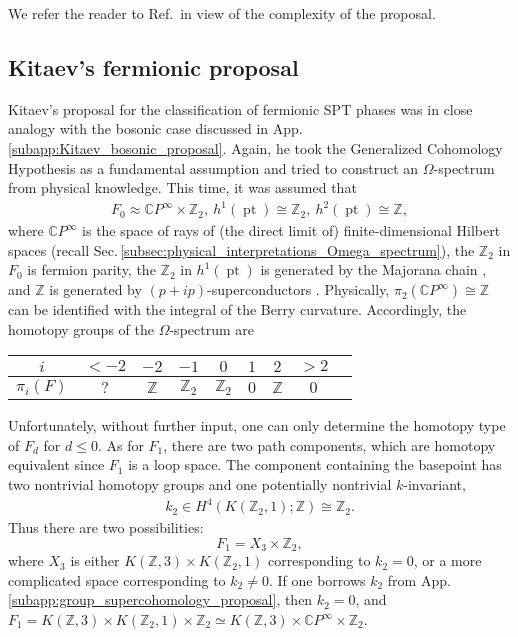 \documentclass[sort&compress]{elsarticle}
\theoremstyle{theoremstyle}
\theoremstyle{framedtheoremstyle}
\theoremstyle{definitionstyle}
\theoremstyle{definitionstyle}
\theoremstyle{definitionstyle}
\theoremstyle{definitionstyle}
\theoremstyle{nameddefinitionstyle}
\theoremstyle{framednameddefinitionstyle}
\theoremstyle{proofstyle}
\theoremstyle{definitionstyle}
\newcommand{\ZZZ}{\mathbb{Z}}
\newcommand{\CCC}{\mathbb{C}}
\newcommand{\homeomorphic}{\approx}
\newcommand{\homotopic}{\simeq}
\newcommand{\isomorphic}{\cong}
\newcommand{\paren}[1]{\left( #1 \right)}
\DeclareMathOperator{\pt}{pt}
\begin{document}
\begin{appendices}
We refer the reader to Ref.\,\cite{Kapustin_Fermion} in view of the complexity of the proposal.





\subsection{Kitaev's fermionic proposal \label{subapp:Kitaev_fermionic_proposal}}

Kitaev's proposal \cite{Kitaev_Stony_Brook_2013_SRE, Kitaev_IPAM} for the classification of fermionic SPT phases was in close analogy with the bosonic case discussed in App.\,\ref{subapp:Kitaev_bosonic_proposal}.
Again, he took the Generalized Cohomology Hypothesis as a fundamental assumption and tried to construct an $\Omega$-spectrum from physical knowledge.
This time, it was assumed that
\begin{eqnarray}
F_0 \homeomorphic \CCC P^\infty \times \ZZZ_2, ~ h^1\paren{\pt} \isomorphic \ZZZ_2, ~ h^2\paren{\pt} \isomorphic \ZZZ,
\end{eqnarray}
where $\CCC P^\infty$ is the space of rays of (the direct limit of) finite-dimensional Hilbert spaces (recall Sec.\,\ref{subsec:physical_interpretations_Omega_spectrum}), the $\ZZZ_2$ in $F_0$ is fermion parity, the $\ZZZ_2$ in $h^1\paren{\pt}$ is generated by the Majorana chain \cite{Majorana_chain}, and $\ZZZ$ is generated by $\paren{p+ip}$-superconductors \cite{Volovik_p+ip, Read_p+ip, Ivanov_p+ip}.
Physically, $\pi_2(\CCC P^\infty)\isomorphic \ZZZ$ can be identified with the integral of the Berry curvature.
Accordingly, the homotopy groups of the $\Omega$-spectrum are
\begin{center}
\begin{tabular}{c|cccccccc}
$i$ & $<-2$ & $-2$ & $-1$ & $0$ & $1$ & $2$ & $>2$ \\
\hline
$\pi_i\paren{F}$ & $?$ & $\ZZZ$ & $\ZZZ_2$ & $\ZZZ_2$ & $0$ & $\ZZZ$ & $0$ \\
\end{tabular}
\end{center}
Unfortunately, without further input, one can only determine the homotopy type of $F_d$ for $d\leq 0$. As for $F_1$, there are two path components, which are homotopy equivalent since $F_1$ is a loop space. The component containing the basepoint has two nontrivial homotopy groups and one potentially nontrivial $k$-invariant,
\begin{eqnarray}
k_2 \in H^4\paren{K\paren{\ZZZ_2, 1}; \ZZZ} \isomorphic \ZZZ_2.
\end{eqnarray}
Thus there are two possibilities:
\begin{equation}
F_1 = X_3 \times \ZZZ_2,
\end{equation}
where $X_3$ is either $K(\ZZZ,3) \times K(\ZZZ_2, 1)$ corresponding to $k_2=0$, or a more complicated space corresponding to $k_2\neq 0$. If one borrows $k_2$ from App.\,\ref{subapp:group_supercohomology_proposal}, then $k_2 = 0$, and $F_1 = K\paren{\ZZZ, 3} \times K\paren{\ZZZ_2,1} \times \ZZZ_2 \homotopic K(\ZZZ,3) \times \CCC P^\infty \times \ZZZ_2$.


\end{appendices}
\end{document}
